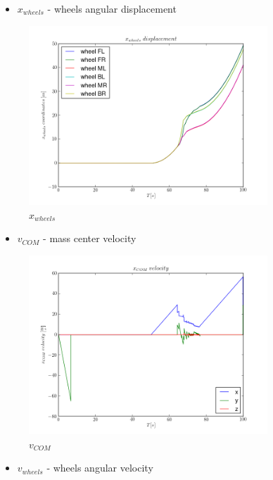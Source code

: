 \begin{itemize}
  \item $x_{wheels}$ - wheels angular displacement 
\end{itemize}

\begin{figure}[H]
  \centering
    \includegraphics[width=0.8\textwidth]{xWHEELS7}
  \caption{$x_{wheels}$}
\end{figure}

\begin{itemize}
  \item $v_{COM}$ - mass center velocity
\end{itemize}

\begin{figure}[H]
  \centering
    \includegraphics[width=0.8\textwidth]{vCOM7}
  \caption{$v_{COM}$}
\end{figure}

\begin{itemize}
  \item $v_{wheels}$ - wheels angular velocity
\end{itemize}

